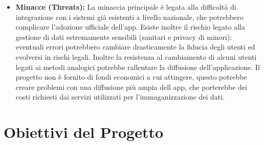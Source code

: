 \documentclass[11pt]{article}
\begin{document}
\begin{itemize}[topsep=0.5 pt]
  \item \textbf{Minacce (Threats):}
  La minaccia principale è legata alla difficoltà di integrazione con i sistemi già esistenti a livello nazionale, che potrebbero complicare l'adozione ufficiale dell'app. Esiste inoltre il rischio legato alla gestione di dati estremamente sensibili (sanitari e privacy di minori): eventuali errori potrebbero cambiare drasticamente la fiducia degli utenti ed evolversi in rischi legali. Inoltre la resistenza al cambiamento di alcuni utenti legati ai metodi analogici potrebbe rallentare la diffusione dell'applicazione. Il progetto non è fornito di fondi economici a cui attingere, questo potrebbe creare problemi con una diffusione più ampia dell app, che porterebbe dei costi richiesti dai servizi utilizzati per l'immaganizzazione dei dati.
\end{itemize}

\newpage
\section{Obiettivi del Progetto}
\end{document}
